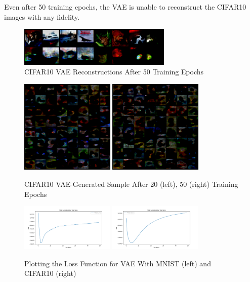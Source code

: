 \documentclass[letterpaper, 10pt]{article}
\begin{document}
Even after 50 training epochs, the VAE is unable to reconstruct the CIFAR10
images with any fidelity.

\begin{figure}[h]
 \caption{CIFAR10 VAE Reconstructions After 50 Training Epochs}
 \centering
 \includegraphics[width=0.65\textwidth]{cifar10_vae_reconstruction_50epochs}
\end{figure}


\begin{figure}[h]
 \caption{CIFAR10 VAE-Generated Sample After 20 (left), 50 (right) Training Epochs}
 \centering
 \includegraphics[width=0.4\textwidth]{cifar10_vae_sample_20epochs}
 \includegraphics[width=0.4\textwidth]{cifar10_vae_sample_50epochs}
\end{figure}

\begin{figure}[h]
 \caption{Plotting the Loss Function for VAE With MNIST (left) and CIFAR10 (right)}
 \centering
 \includegraphics[width=0.4\textwidth]{mnist_vae_loss_plot}
 \includegraphics[width=0.4\textwidth]{cifar10_vae_loss_plot}
\end{figure}
\end{document}
